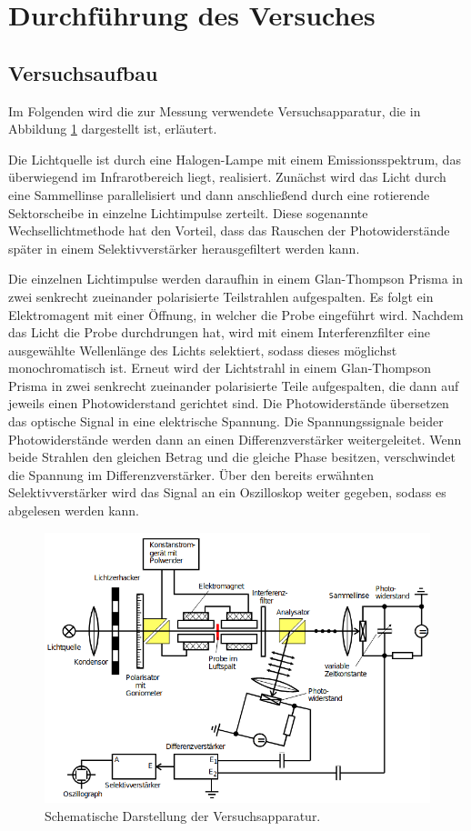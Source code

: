 \section{Durchführung des Versuches}
\label{sec:Durchführung}
\subsection{Versuchsaufbau}
Im Folgenden wird die zur Messung verwendete Versuchsapparatur, die in Abbildung \ref{fig:apparatur} dargestellt ist, erläutert.

\noindent
Die Lichtquelle ist durch eine Halogen-Lampe mit einem Emissionsspektrum, das überwiegend im Infrarotbereich liegt, realisiert. 
Zunächst wird das Licht durch eine Sammellinse parallelisiert und dann anschließend durch eine rotierende Sektorscheibe in 
einzelne Lichtimpulse zerteilt. 
Diese sogenannte Wechsellichtmethode hat den Vorteil, dass das Rauschen der Photowiderstände später in einem Selektivverstärker
herausgefiltert werden kann.

\noindent
Die einzelnen Lichtimpulse werden daraufhin in einem Glan-Thompson Prisma in zwei senkrecht 
zueinander polarisierte Teilstrahlen aufgespalten. Es folgt ein Elektromagent mit einer Öffnung, in welcher die Probe eingeführt
wird. Nachdem das Licht die Probe durchdrungen hat, wird mit einem Interferenzfilter eine ausgewählte Wellenlänge des Lichts 
selektiert, sodass dieses möglichst monochromatisch ist. Erneut wird der Lichtstrahl in einem Glan-Thompson Prisma in zwei 
senkrecht zueinander polarisierte Teile aufgespalten, die dann auf jeweils einen Photowiderstand gerichtet sind. Die Photowiderstände
übersetzen das optische Signal in eine elektrische Spannung. Die Spannungssignale beider Photowiderstände werden dann an einen
Differenzverstärker weitergeleitet. Wenn beide Strahlen den gleichen Betrag und die gleiche Phase besitzen, verschwindet die Spannung
im Differenzverstärker. Über den bereits erwähnten Selektivverstärker wird das Signal an ein Oszilloskop weiter gegeben, sodass
es abgelesen werden kann.   

\begin{figure}[H]
    \centering
    \includegraphics[scale=0.7]{pictures/Versuchsaufbau.png}
    \caption{Schematische Darstellung der Versuchsapparatur. \cite{Versuchsbeschreibung}}
    \label{fig:apparatur}
\end{figure}

